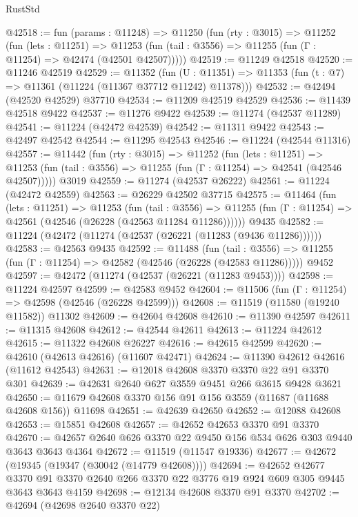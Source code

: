\begin{lexlean}{RustStd}
\begin{coremodule}
@42518 := fun (params : @11248) =>
  @11250
    (fun (rty : @3015) =>
    @11252
      (fun (lets : @11251) =>
      @11253 (fun (tail : @3556) => @11255 (fun (Γ : @11254) => @42474 (@42501 @42507)))))
@42519 := @11249 @42518
@42520 := @11246 @42519
@42529 := @11352
    (fun (U : @11351) => @11353 (fun (t : @7) => @11361 (@11224 (@11367 @37712 @11242) @11378)))
@42532 := @42494 (@42520 @42529) @37710
@42534 := @11209 @42519 @42529
@42536 := @11439 @42518 @9422
@42537 := @11276 @9422
@42539 := @11274 (@42537 @11289)
@42541 := @11224 (@42472 @42539)
@42542 := @11311 @9422
@42543 := @42497 @42542
@42544 := @11295 @42543
@42546 := @11224 (@42544 @11316)
@42557 := @11442
    (fun (rty : @3015) =>
    @11252
      (fun (lets : @11251) =>
      @11253 (fun (tail : @3556) => @11255 (fun (Γ : @11254) => @42541 (@42546 @42507)))))
    @3019
@42559 := @11274 (@42537 @26222)
@42561 := @11224 (@42472 @42559)
@42563 := @26229 @42502 @37715
@42575 := @11464
    (fun (lets : @11251) =>
    @11253
      (fun (tail : @3556) =>
      @11255 (fun (Γ : @11254) => @42561 (@42546 (@26228 (@42563 @11284 @11286))))))
    @9435
@42582 := @11224 (@42472 (@11274 (@42537 (@26221 (@11283 (@9436 @11286))))))
@42583 := @42563 @9435
@42592 := @11488
    (fun (tail : @3556) => @11255 (fun (Γ : @11254) => @42582 (@42546 (@26228 (@42583 @11286)))))
    @9452
@42597 := @42472 (@11274 (@42537 (@26221 (@11283 @9453))))
@42598 := @11224 @42597
@42599 := @42583 @9452
@42604 := @11506 (fun (Γ : @11254) => @42598 (@42546 (@26228 @42599)))
@42608 := @11519 (@11580 (@19240 @11582)) @11302
@42609 := @42604 @42608
@42610 := @11390 @42597
@42611 := @11315 @42608
@42612 := @42544 @42611
@42613 := @11224 @42612
@42615 := @11322 @42608 @26227
@42616 := @42615 @42599
@42620 := @42610 (@42613 @42616) (@11607 @42471)
@42624 := @11390 @42612 @42616 (@11612 @42543)
@42631 := @12018 @42608 @3370 @3370 @22 @91 @3370 @301
@42639 := @42631 @2640 @627 @3559 @9451 @266 @3615 @9428 @3621
@42650 := @11679 @42608 @3370 @156 @91 @156 @3559 (@11687 (@11688 @42608 @156)) @11698
@42651 := @42639 @42650
@42652 := @12088 @42608
@42653 := @15851 @42608
@42657 := @42652 @42653 @3370 @91 @3370
@42670 := @42657 @2640 @626 @3370 @22 @9450 @156 @534 @626 @303 @9440 @3643 @3643 @4364
@42672 := @11519 (@11547 @19336)
@42677 := @42672 (@19345 (@19347 (@30042 (@14779 @42608))))
@42694 := @42652
    @42677
    @3370
    @91
    @3370
    @2640
    @266
    @3370
    @22
    @3776
    @19
    @924
    @609
    @305
    @9445
    @3643
    @3643
    @4159
@42698 := @12134 @42608 @3370 @91 @3370
@42702 := @42694 (@42698 @2640 @3370 @22)

\end{coremodule}
\end{lexlean}
